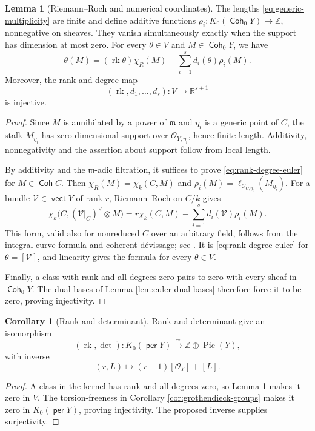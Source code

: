 \documentclass[a4paper,reqno]{amsart}
\def\O{\mathcal{O}}
\def\V{\mathcal{V}}
\def\m{\mathfrak{m}}
\DeclareMathOperator{\Coh}{\mathsf{Coh}}
\DeclareMathOperator{\vect}{\mathsf{vect}}
\DeclareMathOperator{\per}{\mathsf{per}}
\DeclareMathOperator{\Pic}{Pic}
\DeclareMathOperator{\rk}{rk}
\theoremstyle{definition}
\newtheorem{Lem}[Thm]{Lemma}
\newtheorem{Cor}[Thm]{Corollary}
\begin{document}
\begin{Lem}[Riemann--Roch and numerical coordinates]\label{lem:numerical-devissage}
The lengths \eqref{eq:generic-multiplicity} are finite and define additive functions $\rho_i\colon K_0(\Coh_0Y)\to\mathbb Z$, nonnegative on sheaves. They vanish simultaneously exactly when the support has dimension at most zero. For every $\theta\in V$ and $M\in\Coh_0Y$, we have
\begin{equation}\label{eq:rank-degree-euler}
\theta(M)=(\rk\theta)\chi_R(M)-\sum_{i=1}^s d_i(\theta)\rho_i(M).
\end{equation}
Moreover, the rank-and-degree map
\[
(\rk,d_1,\ldots,d_s)\colon V\longrightarrow\mathbb R^{s+1}
\]
is injective.
\end{Lem}
\begin{proof}
Since $M$ is annihilated by a power of $\m$ and $\eta_i$ is a generic point of $C$, the stalk $M_{\eta_i}$ has zero-dimensional support over $\O_{Y,\eta_i}$, hence finite length. Additivity, nonnegativity and the assertion about support follow from local length.

By additivity and the $\m$-adic filtration, it suffices to prove \eqref{eq:rank-degree-euler} for $M\in\Coh C$. Then $\chi_R(M)=\chi_k(C,M)$ and $\rho_i(M)=\ell_{\O_{C,\eta_i}}(M_{\eta_i})$. For a bundle $\V\in\vect Y$ of rank $r$, Riemann--Roch on $C/k$ gives
\[
\chi_k\bigl(C,(\V|_C)^\vee\otimes M\bigr)
=r\chi_k(C,M)-\sum_{i=1}^s d_i(\V)\rho_i(M).
\]
This form, valid also for nonreduced $C$ over an arbitrary field, follows from the integral-curve formula and coherent d\'evissage; see \cite[Tags 0AYV, 0DJ5, and 01YI]{stacks-project}. It is \eqref{eq:rank-degree-euler} for $\theta=[\V]$, and linearity gives the formula for every $\theta\in V$.

Finally, a class with rank and all degrees zero pairs to zero with every sheaf in $\Coh_0Y$. The dual bases of Lemma \ref{lem:euler-dual-bases} therefore force it to be zero, proving injectivity.
\end{proof}

\begin{Cor}[Rank and determinant]\label{cor:rank-determinant}
Rank and determinant give an isomorphism
\[
(\rk,\det)\colon K_0(\per Y)\xrightarrow{\ \sim\ }\mathbb Z\oplus\Pic(Y),
\]
with inverse
\[
(r,L)\longmapsto(r-1)[\O_Y]+[L].
\]
\end{Cor}
\begin{proof}
A class in the kernel has rank and all degrees zero, so Lemma \ref{lem:numerical-devissage} makes it zero in $V$. The torsion-freeness in Corollary \ref{cor:grothendieck-groups} makes it zero in $K_0(\per Y)$, proving injectivity. The proposed inverse supplies surjectivity.
\end{proof}
\end{document}
